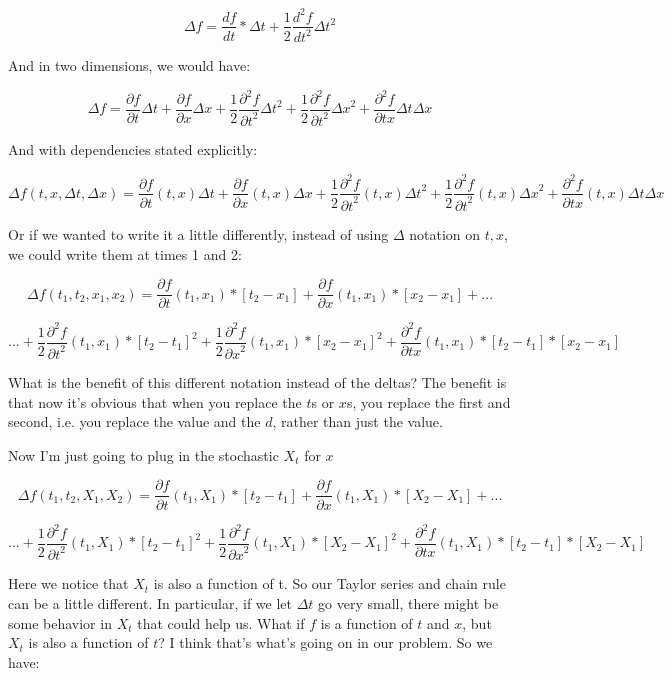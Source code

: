 \documentclass{article}
\begin{document}
$$\Delta f = \frac{df}{dt} * \Delta t + \frac{1}{2} \frac{d^2f}{dt^2} \Delta t ^2$$

And in two dimensions, we would have: 

$$\Delta f = \frac{\partial f}{\partial t} \Delta t + \frac{\partial f}{\partial x} \Delta x + \frac{1}{2}\frac{\partial^2 f}{{\partial t}^2} {\Delta t}^2 + \frac{1}{2}\frac{\partial^2 f}{{\partial t}^2} {\Delta x}^2 +  \frac{\partial^2 f}{\partial tx} \Delta t\Delta x$$

And with dependencies stated explicitly:

$$\Delta f(t,x,\Delta t,\Delta x) = \frac{\partial f}{\partial t}(t,x) \Delta t + \frac{\partial f}{\partial x}(t,x) \Delta x  + \frac{1}{2}\frac{\partial^2 f}{{\partial t}^2}(t,x) {\Delta t}^2 + \frac{1}{2}\frac{\partial^2 f}{{\partial t}^2}(t,x) {\Delta x}^2 +  \frac{\partial^2 f}{\partial tx}(t,x) \Delta t\Delta x$$

Or if we wanted to write it a little differently, instead of using $\Delta$ notation on $t, x$, we could write them at times 1 and 2:

$$\Delta f(t_1,t_2,x_1,x_2) = \frac{\partial f}{\partial t}(t_1,x_1) *[t_2-x_1] + \frac{\partial f}{\partial x}(t_1,x_1) *[x_2-x_1]  + ... $$

$$... +  \frac{1}{2}\frac{\partial^2 f}{{\partial t}^2}(t_1,x_1) * {[t_2-t_1]}^2 + \frac{1}{2}\frac{\partial^2 f}{{\partial x}^2}(t_1,x_1) * {[x_2-x_1]}^2 +  \frac{\partial^2 f}{\partial tx}(t_1,x_1) *[t_2-t_1]*[x_2-x_1]$$

What is the benefit of this different notation instead of the deltas? The benefit is that now it's obvious that when you replace the $t$s or $x$s, you replace the first and second, i.e. you replace the value and the $d$, rather than just the value. 

Now I'm just going to plug in the stochastic $X_t$ for $x$

$$\Delta f(t_1,t_2,X_1,X_2) = \frac{\partial f}{\partial t}(t_1,X_1) *[t_2-t_1] + \frac{\partial f}{\partial x}(t_1,X_1) *[X_2-X_1]  + ... $$

$$... +  \frac{1}{2}\frac{\partial^2 f}{{\partial t}^2}(t_1,X_1) * {[t_2-t_1]}^2 + \frac{1}{2}\frac{\partial^2 f}{{\partial x}^2}(t_1,X_1) * {[X_2-X_1]}^2 +  \frac{\partial^2 f}{\partial tx}(t_1,X_1) *[t_2-t_1]*[X_2-X_1]$$

Here we notice that $X_t$ is also a function of t. So our Taylor series and chain rule can be a little different.  In particular, if we let $\Delta t$ go very small, there might be some behavior in $X_t$ that could help us. What if $f$ is a function of $t$ and $x$, but $X_t$ is also a function of $t$? I think that's what's going on in our problem.  So we have:
\end{document}
